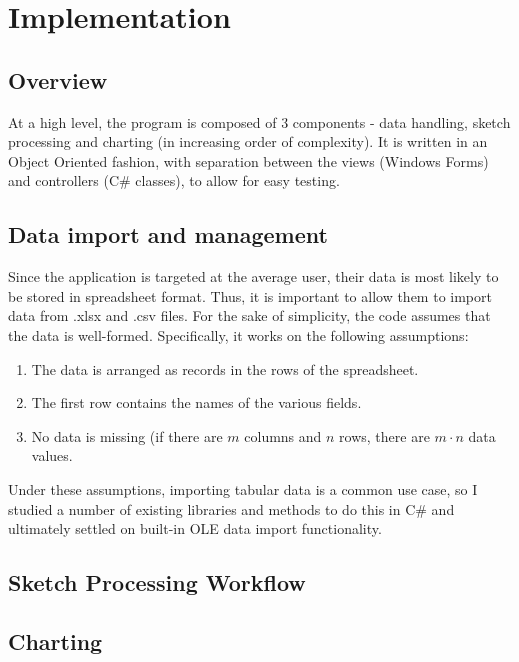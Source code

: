 \chapter{Implementation}
	\section{Overview}
		At a high level, the program is composed of 3 components - data handling, sketch processing and charting (in increasing order of complexity). It is written in an Object Oriented fashion, with separation between the views (Windows Forms) and controllers (C\# classes), to allow for easy testing.
	\section{Data import and management}
		Since the application is targeted at the average user, their data is most likely to be stored in spreadsheet format. Thus, it is important to allow them to import data from .xlsx and .csv files. 
		For the sake of simplicity, the code assumes that the data is well-formed. Specifically, it works on the following assumptions:
		\begin{enumerate}
		\item The data is arranged as records in the rows of the spreadsheet.
		\item The first row contains the names of the various fields.
		\item No data is missing (if there are $m$ columns and $n$ rows, there are $m \cdot n$ data values.
		\end{enumerate}
		
		Under these assumptions, importing tabular data is a common use case, so I studied a number of existing libraries and methods to do this in C\# and ultimately settled on built-in OLE data import functionality. 
	\section{Sketch Processing Workflow}
	\section{Charting}
	